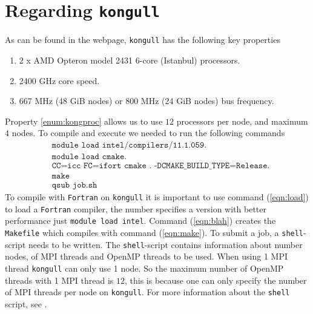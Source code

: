 \documentclass{article}
\begin{document}

\section{Regarding \texttt{kongull}}
As can be found in the webpage\cite{kongull}, \texttt{kongull} has the following key properties
\begin{enumerate}
    \item \label{enum:kongproc} 2 x AMD Opteron model 2431 6-core (Istanbul) processors.
    \item \label{enum:kongspeed} 2400 GHz core speed.
    \item \label{enum:kongfreq} 667 MHz (48 GiB nodes) or 800 MHz (24 GiB nodes) bus frequency.
\end{enumerate}
Property \ref{enum:kongproc} allows us to use $12$ processors per node, and maximum 4 nodes. To compile and execute we needed to run the following commands
\begin{align}
    &\texttt{module load intel/compilers/11.1.059}. \label{eqn:load} \\
    &\texttt{module load cmake}.\\
    &\texttt{CC=icc FC=ifort cmake . -DCMAKE\_BUILD\_TYPE=Release}.  \label{eqn:blah} \\
    &\texttt{make}                                                  \label{eqn:make} \\
    &\texttt{qsub job.sh}
\end{align}
To compile with \texttt{Fortran} on \texttt{kongull} it is important to use command (\ref{eqn:load}) to load a \texttt{Fortran} compiler, the number specifies a version with better performance just \texttt{module load intel}. Command (\ref{eqn:blah}) creates the \texttt{Makefile} which compiles with command (\ref{eqn:make}). To submit a job, a \texttt{shell}-script needs to be written. The \texttt{shell}-script contains information about number nodes, of MPI threads and OpenMP threads to be used. When using 1 MPI thread \texttt{kongull} can only use 1 node. So the maximum number of OpenMP threads with 1 MPI thread is $12$, this is because one can only specify the number of MPI threads per node on \texttt{kongull}. For more information about the \texttt{shell} script, see \cite{shell}.
\end{document}
